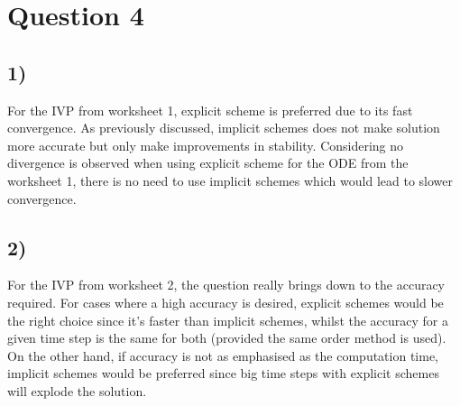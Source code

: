 \documentclass[preprint,authoryear,10pt]{elsarticle}
\begin{document}
\section{Question 4}

\subsection{1)}
For the IVP from worksheet 1, explicit scheme is preferred due to its fast convergence. As previously discussed, implicit schemes does not make solution more accurate but only make improvements in stability. Considering no divergence is observed when using explicit scheme for the ODE from the worksheet 1, there is no need to use implicit schemes which would lead to slower convergence. 

\subsection{2)}
For the IVP from worksheet 2, the question really brings down to the accuracy required. For cases where a high accuracy is desired, explicit schemes would be the right choice since it's faster than implicit schemes, whilst the accuracy for a given time step is the same for both (provided the same order method is used). On the other hand, if accuracy is not as emphasised as the computation time, implicit schemes would be preferred since big time steps with explicit schemes will explode the solution. 
\end{document}
